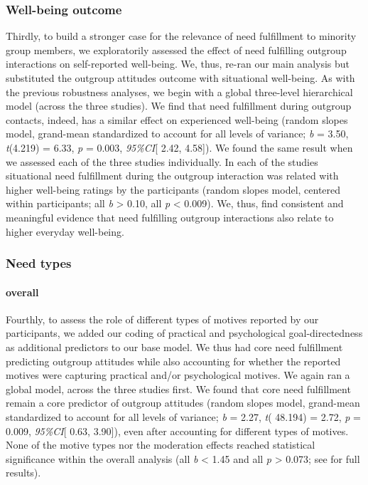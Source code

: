 \subsubsection{Well-being outcome}

Thirdly, to build a stronger case for the relevance of need fulfillment
to minority group members, we exploratorily assessed the effect of need
fulfilling outgroup interactions on self-reported well-being. We, thus,
re-ran our main analysis but substituted the outgroup attitudes outcome
with situational well-being. As with the previous robustness analyses,
we begin with a global three-level hierarchical model (across the three
studies). We find that need fulfillment during outgroup contacts,
indeed, has a similar effect on experienced well-being (random slopes
model, grand-mean standardized to account for all levels of variance;
\textit{b} = 3.50, \textit{t}(4.219) = 6.33, \textit{p} = 0.003,
\textit{95\%CI}{[} 2.42, 4.58{]}). We found the same result when we
assessed each of the three studies individually. In each of the studies
situational need fulfillment during the outgroup interaction was related
with higher well-being ratings by the participants (random slopes model,
centered within participants; all \textbar{}\textit{b}\textbar{}
\textgreater{} 0.10, all \textit{p} \textless{} 0.009). We, thus, find
consistent and meaningful evidence that need fulfilling outgroup
interactions also relate to higher everyday well-being.

\subsubsection{Need types}

\paragraph{overall}

Fourthly, to assess the role of different types of motives reported by
our participants, we added our coding of practical and psychological
goal-directedness as additional predictors to our base model. We thus
had core need fulfillment predicting outgroup attitudes while also
accounting for whether the reported motives were capturing practical
and/or psychological motives. We again ran a global model, across the
three studies first. We found that core need fulfillment remain a core
predictor of outgroup attitudes (random slopes model, grand-mean
standardized to account for all levels of variance; \textit{b} = 2.27,
\textit{t}( 48.194) = 2.72, \textit{p} = 0.009, \textit{95\%CI}{[} 0.63,
3.90{]}), even after accounting for different types of motives. None of
the motive types nor the moderation effects reached statistical
significance within the overall analysis (all
\textbar{}\textit{b}\textbar{} \textless{} 1.45 and all \textit{p}
\textgreater{} 0.073; see  for full
results).

